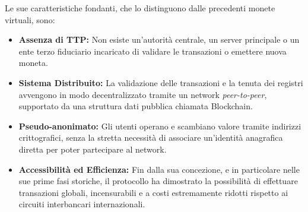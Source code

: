 Le sue caratteristiche fondanti, che lo distinguono dalle precedenti monete virtuali, sono:
\begin{itemize}
    \item \textbf{Assenza di TTP:} Non esiste un'autorità centrale, un server principale o un ente terzo fiduciario incaricato di validare le transazioni o emettere nuova moneta.
    \item \textbf{Sistema Distribuito:} La validazione delle transazioni e la tenuta dei registri avvengono in modo decentralizzato tramite un network \textit{peer-to-peer}, supportato da una struttura dati pubblica chiamata Blockchain.
    \item \textbf{Pseudo-anonimato:} Gli utenti operano e scambiano valore tramite indirizzi crittografici, senza la stretta necessità di associare un'identità anagrafica diretta per poter partecipare al network.
    \item \textbf{Accessibilità ed Efficienza:} Fin dalla sua concezione, e in particolare nelle sue prime fasi storiche, il protocollo ha dimostrato la possibilità di effettuare transazioni globali, incensurabili e a costi estremamente ridotti rispetto ai circuiti interbancari internazionali.
\end{itemize}


